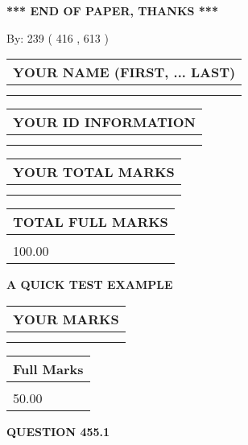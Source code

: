 \documentclass[12pt]{article}
\begin{document}
\vspace{1.0in} 
{\textbf{\large{ *** END OF PAPER, THANKS *** }}} 
   
   
\hspace{1.0in} By: 
 239 ( 416 ,  613 )
   
   
   
   
\newpage 
\setcounter{page}{ 
   455001 } 
   
   
   
   
\noindent\begin{tabular}{|l|}
\hline
YOUR NAME (FIRST, ... LAST)  \\
\hline
 \\ 
 \\ 
\hline
\end{tabular}
\hspace{0.05in} \begin{tabular}{|l|}
\hline
 YOUR   ID   INFORMATION  \\
\hline
 \\ 
 \\ 
\hline
\end{tabular}
   
   
\vspace{0.2in}\noindent\begin{tabular}{|l|}
\hline
YOUR TOTAL MARKS  \\
\hline
 \\ 
 \\ 
\hline
\end{tabular}
\hspace{0.05in} \begin{tabular}{|l|}
\hline
TOTAL FULL MARKS  \\
\hline
 \\ 
100.00 \\
\hline
\end{tabular}
   
   
 \vspace{0.2in}
{\LARGE {\textbf{ A QUICK TEST EXAMPLE}}}
   
   
  
\vspace{0.2in}
  
\noindent\begin{tabular}{|l|}
\hline
 YOUR MARKS  \\
\hline
 \\ 
 \\ 
\hline
\end{tabular}
\hspace{0.05in} \begin{tabular}{|l|}
\hline
 Full Marks  \\
\hline
 \\ 
50.00 \\
\hline
\end{tabular}
{\textbf{\Large{QUESTION
455.1 
}}}
  
\end{document}
